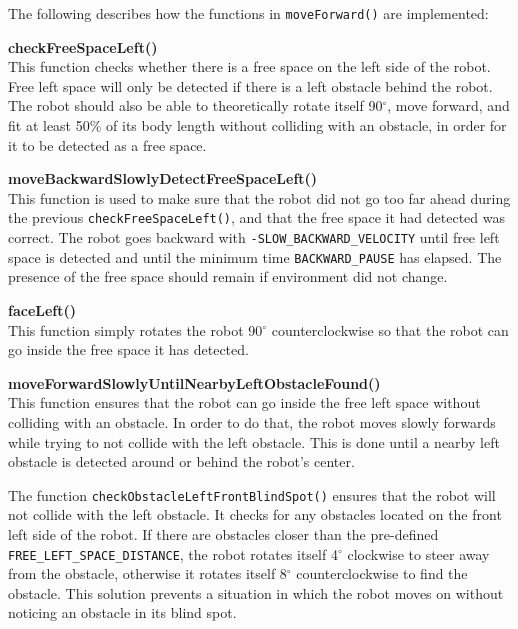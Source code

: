 The following describes how the functions in \texttt{moveForward()} are implemented:


\begin{description}

\item \textbf{checkFreeSpaceLeft()} \hfill \\
This function checks whether there is a free space on the left side of the robot. Free left space will only be detected if there is a left obstacle behind the robot. The robot should also be able to theoretically rotate itself 90$^{\circ}$, move forward, and fit at least 50\% of its body length without colliding with an obstacle, in order for it to be detected as a free space.

\item \textbf{moveBackwardSlowlyDetectFreeSpaceLeft()} \hfill \\
This function is used to make sure that the robot did not go too far ahead during the previous \texttt{checkFreeSpaceLeft()}, and that the free space it had detected was correct. The robot goes backward with \texttt{-SLOW\_BACKWARD\_VELOCITY} until free left space is detected and until the minimum time \texttt{BACKWARD\_PAUSE} has elapsed. The presence of the free space should remain if environment did not change.

\item \textbf{faceLeft()} \hfill \\
This function simply rotates the robot 90$^{\circ}$ counterclockwise so that the robot can go inside the free space it has detected.

\item \textbf{moveForwardSlowlyUntilNearbyLeftObstacleFound()} \hfill \\
This function ensures that the robot can go inside the free left space without colliding with an obstacle. In order to do that, the robot moves slowly forwards while trying to not collide with the left obstacle. This is done until a nearby left obstacle is detected around or behind the robot's center.

The function \texttt{checkObstacleLeftFrontBlindSpot()} ensures that the robot will not collide with the left obstacle. It checks for any obstacles located on the front left side of the robot. If there are obstacles closer than the pre-defined \texttt{FREE\_LEFT\_SPACE\_DISTANCE}, the robot rotates itself 4$^{\circ}$ clockwise to steer away from the obstacle, otherwise it rotates itself 8$^{\circ}$ counterclockwise to find the obstacle. This solution prevents a situation in which the robot moves on without noticing an obstacle in its blind spot.


\end{description}
